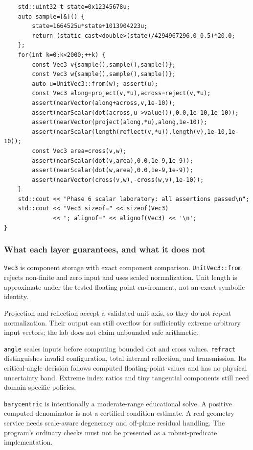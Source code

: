 \begin{verbatim}
    std::uint32_t state=0x12345678u;
    auto sample=[&]() {
        state=1664525u*state+1013904223u;
        return (static_cast<double>(state)/4294967296.0-0.5)*20.0;
    };
    for(int k=0;k<2000;++k) {
        const Vec3 v{sample(),sample(),sample()};
        const Vec3 w{sample(),sample(),sample()};
        auto u=UnitVec3::from(w); assert(u);
        const Vec3 along=project(v,*u),across=reject(v,*u);
        assert(nearVector(along+across,v,1e-10));
        assert(nearScalar(dot(across,u->value()),0.0,1e-10,1e-10));
        assert(nearVector(project(along,*u),along,1e-10));
        assert(nearScalar(length(reflect(v,*u)),length(v),1e-10,1e-10));
        const Vec3 area=cross(v,w);
        assert(nearScalar(dot(v,area),0.0,1e-9,1e-9));
        assert(nearScalar(dot(w,area),0.0,1e-9,1e-9));
        assert(nearVector(cross(v,w),-cross(w,v),1e-10));
    }
    std::cout << "Phase 6 scalar laboratory: all assertions passed\n";
    std::cout << "Vec3 sizeof=" << sizeof(Vec3)
              << "; alignof=" << alignof(Vec3) << '\n';
}
\end{verbatim}

\subsubsection{What each layer guarantees, and what it does not}\label{02-foundations-ii-ch037-what-each-layer-guarantees-and-what-it-does-not}

\texttt{Vec3} is component storage with exact component comparison. \texttt{UnitVec3::from} rejects non-finite and zero input and uses scaled normalization. Unit length is approximate under the tested floating-point environment, not an exact symbolic identity.

Projection and reflection accept a validated unit axis, so they do not repeat normalization. Their output can still overflow for sufficiently extreme arbitrary input vectors; the lab does not claim unbounded safe arithmetic.

\texttt{angle} scales inputs before computing bounded dot and cross values. \texttt{refract} distinguishes invalid configuration, total internal reflection, and transmission. Its critical-angle decision follows computed floating-point values and has no physical uncertainty band. Extreme index ratios and tiny tangential components still need domain-specific policies.

\texttt{barycentric} is intentionally a moderate-range educational solve. A positive computed denominator is not a certified condition estimate. A real geometry service needs scale-aware degeneracy and off-plane residual handling. The program's ordinary checks must not be presented as a robust-predicate implementation.

